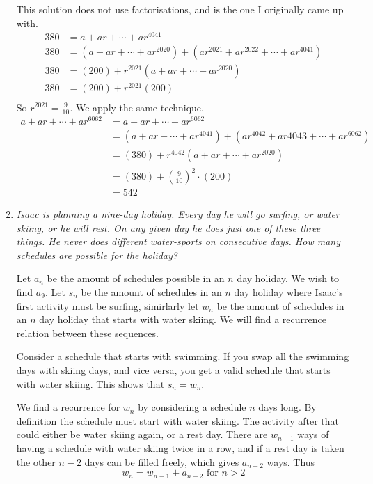\documentclass{article}
\begin{document}
\begin{enumerate}[1.]
This solution does not use factorisations, and is the one I originally came up with.
\begin{align*}
380 &= a +ar + \dotsb +ar^{4041}\\
380 &= (a +ar +\dotsb +ar^{2020}) + (ar^{2021} + ar^{2022} + \dotsb + ar^{4041})\\
380 &= (200) + r^{2021}(a + ar + \dotsb + ar^{2020})\\
380 &= (200) + r^{2021}(200)\\
\end{align*}
So $r^{2021} = \frac{9}{10}$. We apply the same technique.
\begin{align*}
a +ar + \dotsb +ar^{6062} &= a + ar + \dotsb +ar^{6062}\\
&= (a +ar +\dotsb +ar^{4041}) + (ar^{4042} + ar{4043} +  \dotsb + ar^{6062})\\
&= (380) + r^{4042}(a + ar + \dotsb + ar^{2020})\\
&= (380) + \left(\frac{9}{10}\right)^2\cdot(200)\\
&= 542
\end{align*}
  
  \item %
  {\itshape Isaac is planning a nine-day holiday. Every day he will go surfing, or water skiing, or he will rest. On any given day he does just one of these three things. He never does different water-sports on consecutive days. How many schedules are possible for the holiday?}
  
  Let $a_n$ be the amount of schedules possible in an $n$ day holiday. We wish to find $a_9$. Let $s_n$ be the amount of schedules in an $n$ day holiday where Isaac's first activity must be surfing, simirlarly let $w_n$ be the amount of schedules in an $n$ day holiday that starts with water skiing. We will find a recurrence relation between these sequences.

Consider a schedule that starts with swimming. If you swap all the swimming days with skiing days, and vice versa, you get a valid schedule that starts with water skiing. This shows that $s_n = w_n$.

We find a recurrence for $w_n$ by considering a schedule $n$ days long. By definition the schedule must start with water skiing. The activity after that could either be water skiing again, or a rest day. There are $w_{n - 1}$ ways of having a schedule with water skiing twice in a row, and if a rest day is taken the other $n - 2$ days can be filled freely, which gives $a_{n - 2}$ ways. Thus $$w_n = w_{n - 1} + a_{n - 2}\text{ for } n > 2$$


\end{enumerate}
\end{document}
